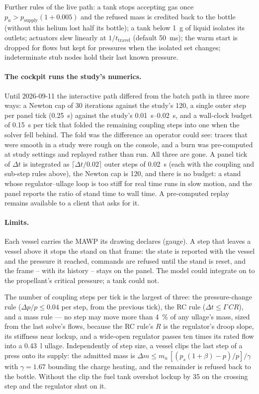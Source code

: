 \documentclass[11pt,a4paper]{article}
\begin{document}
Further rules of the live path: a tank stops accepting gas once
$p_u > p_{\mathrm{supply}}(1+0.005)$ and the refused mass is credited back to
the bottle (without this helium lost half its bottle); a tank below
\SI{1}{\gram} of liquid isolates its outlets; actuators slew linearly at
$1/t_{\mathrm{travel}}$ (default \SI{50}{\milli\second}); the warm start is
dropped for flows but kept for pressures when the isolated set changes;
indeterminate stub nodes hold their last known pressure.

\paragraph{The cockpit runs the study's numerics.} Until 2026-09-11 the
interactive path differed from the batch path in three more ways: a Newton cap
of 30 iterations against the study's 120, a single outer step per panel tick
(\SI{0.25}{\second}) against the study's \SIrange{0.01}{0.02}{\second}, and a
wall-clock budget of \SI{0.15}{\second} per tick that folded the remaining
coupling steps into one when the solver fell behind. The fold was the
difference an operator could see: traces that were smooth in a study were
rough on the console, and a burn was pre-computed at study settings and
replayed rather than run. All three are gone. A panel tick of $\Delta t$ is
integrated as $\lceil\Delta t/0.02\rceil$ outer steps of \SI{0.02}{\second}
(each with the coupling and sub-step rules above), the Newton cap is 120, and
there is no budget: a stand whose regulator--ullage loop is too stiff for real
time runs in slow motion, and the panel reports the ratio of stand time to
wall time. A pre-computed replay remains available to a client that asks for it.

\paragraph{Limits.} Each vessel carries the MAWP its drawing declares (gauge).
A step that leaves a vessel above it stops the stand on that frame: the
state is reported with the vessel and the pressure it reached, commands are
refused until the stand is reset, and the frame -- with its history -- stays
on the panel. The model could integrate on to the propellant's critical
pressure; a tank could not.

The number of coupling steps per tick is the largest of three: the
pressure-change rule ($\Delta p/p \le 0.04$ per step, from the previous tick),
the RC rule ($\Delta t \le \Gamma\,C R$), and a mass rule --- no step may move
more than \SI{4}{\percent} of any ullage's mass, sized from the last solve's
flows, because the RC rule's $R$ is the regulator's droop slope, its stiffness
near lockup, and a wide-open regulator passes ten times its rated flow into a
\SI{0.43}{\litre} ullage. Independently of step size, a vessel clips the last
step of a press onto its supply: the admitted mass is
$\Delta m \le m_u\,[(p_s(1+\beta) - p)/p]/\gamma$ with $\gamma=1.67$ bounding the
charge heating, and the remainder is refused back to the bottle. Without the
clip the fuel tank overshot lockup by \SI{35}{\psi} on the crossing step and the
regulator shut on it.
\end{document}
